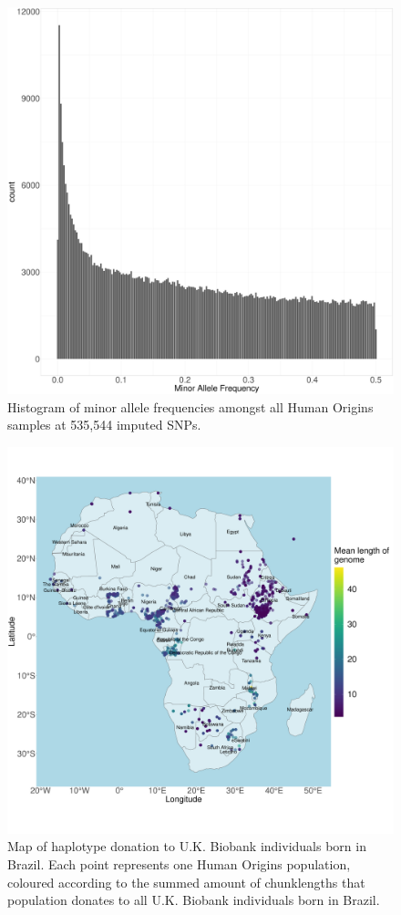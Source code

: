 \begin{figure}[htp]
    \centering
    \includegraphics[width=1.0\textwidth]{../images/appendix/MAF_HIST_imputed.pdf}
    \caption{Histogram of minor allele frequencies amongst all Human Origins samples at 535,544 imputed SNPs.}
    \label{fig:MAF_HIST_imputed}
\end{figure}


\begin{figure}[htp]
    \centering
    \includegraphics[width=1.0\textwidth]{../images/appendix/haplotype_map_Brazil.pdf}
    \caption{Map of haplotype donation to U.K. Biobank individuals born in Brazil. Each point represents one Human Origins population, coloured according to the summed amount of chunklengths that population donates to all U.K. Biobank individuals born in Brazil.}
    \label{fig:haplotype_map_Brazil}
\end{figure}

